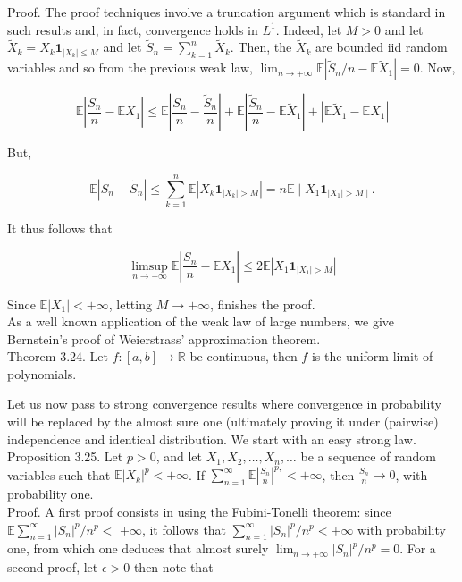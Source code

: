 \documentclass[11pt]{amsbook}
\theoremstyle{plain}%
\theoremstyle{definition}
\theoremstyle{remark}
\begin{document}
Proof. The proof techniques involve a truncation argument which is standard in such results and, in fact, convergence holds in $L^{1}$. Indeed, let $M>0$ and let $\widetilde{X}_{k}=X_{k} \mathbf{1}_{\left|X_{k}\right| \leq M}$ and let $\widetilde{S}_{n}=\sum_{k=1}^{n} \widetilde{X}_{k}$. Then, the $\widetilde{X}_{k}$ are bounded iid random variables and so from the previous weak law, $\lim _{n \rightarrow+\infty} \mathbb{E}\left|\tilde{S}_{n} / n-\mathbb{E} \tilde{X}_{1}\right|=0$. Now,

$$
\mathbb{E}\left|\frac{S_{n}}{n}-\mathbb{E} X_{1}\right| \leq \mathbb{E}\left|\frac{S_{n}}{n}-\frac{\widetilde{S}_{n}}{n}\right|+\mathbb{E}\left|\frac{\widetilde{S}_{n}}{n}-\mathbb{E} \widetilde{X}_{1}\right|+\left|\mathbb{E} \tilde{X}_{1}-\mathbb{E} X_{1}\right|
$$

But,

$$
\mathbb{E}\left|S_{n}-\widetilde{S}_{n}\right| \leq \sum_{k=1}^{n} \mathbb{E}\left|X_{k} \mathbf{1}_{\left|X_{k}\right|>M}\right|=n \mathbb{E} \mid X_{1} \mathbf{1}_{\left|X_{1}\right|>M \mid} .
$$

It thus follows that

$$
\limsup _{n \rightarrow+\infty} \mathbb{E}\left|\frac{S_{n}}{n}-\mathbb{E} X_{1}\right| \leq 2 \mathbb{E}\left|X_{1} \mathbf{1}_{\left|X_{1}\right|>M}\right|
$$

Since $\mathbb{E}\left|X_{1}\right|<+\infty$, letting $M \rightarrow+\infty$, finishes the proof.\\
As a well known application of the weak law of large numbers, we give Bernstein's proof of Weierstrass' approximation theorem.\\
Theorem 3.24. Let $f:[a, b] \longrightarrow \mathbb{R}$ be continuous, then $f$ is the uniform limit of polynomials.

Let us now pass to strong convergence results where convergence in probability will be replaced by the almost sure one (ultimately proving it under (pairwise) independence and identical distribution. We start with an easy strong law.\\
Proposition 3.25. Let $p>0$, and let $X_{1}, X_{2}, \ldots, X_{n}, \ldots$ be a sequence of random variables such that $\mathbb{E}\left|X_{k}\right|^{p}<+\infty$. If $\sum_{n=1}^{\infty} \mathbb{E}\left|\frac{S_{n}}{n}\right|^{p,}<+\infty$, then $\frac{S_{n}}{n} \rightarrow 0$, with probability one.\\
Proof. A first proof consists in using the Fubini-Tonelli theorem: since $\mathbb{E} \sum_{n=1}^{\infty}\left|S_{n}\right|^{p} / n^{p}<$ $+\infty$, it follows that $\sum_{n=1}^{\infty}\left|S_{n}\right|^{p} / n^{p}<+\infty$ with probability one, from which one deduces that almost surely $\lim _{n \rightarrow+\infty}\left|S_{n}\right|^{p} / n^{p}=0$. For a second proof, let $\epsilon>0$ then note that
\end{document}
